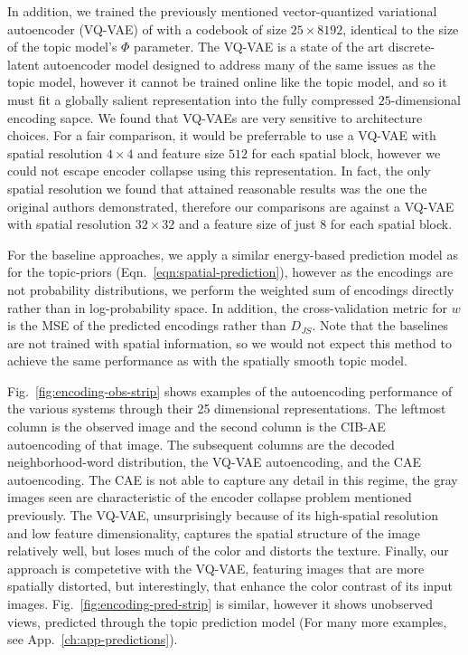 In addition, we trained the previously mentioned vector-quantized variational autoencoder (VQ-VAE) of \citep{vqvae2017} with a codebook of size $25 \times 8192$, identical to the size of the topic model's $\Phi$ parameter. The VQ-VAE is a state of the art discrete-latent autoencoder model designed to address many of the same issues as the topic model, however it cannot be trained online like the topic model, and so it must fit a globally salient representation into the fully compressed $25$-dimensional encoding sapce. We found that VQ-VAEs are very sensitive to architecture choices. For a fair comparison, it would be preferrable to use a VQ-VAE with spatial resolution $4 \times 4$ and feature size $512$ for each spatial block, however we could not escape encoder collapse using this representation. In fact, the only spatial resolution we found that attained reasonable results was the one the original authors demonstrated, therefore our comparisons are against a VQ-VAE with spatial resolution $32 \times 32$ and a feature size of just $8$ for each spatial block.

For the baseline approaches, we apply a similar energy-based prediction model as for the topic-priors (Eqn.~\ref{eqn:spatial-prediction}), however as the encodings are not probability distributions, we perform the weighted sum of encodings directly rather than in log-probability space. In addition, the cross-validation metric for $w$ is the MSE of the predicted encodings rather than $D_{JS}$. Note that the baselines are not trained with spatial information, so we would not expect this method to achieve the same performance as with the spatially smooth topic model.

Fig.~\ref{fig:encoding-obs-strip} shows examples of the autoencoding performance of the various systems through their 25 dimensional representations. The leftmost column is the observed image and the second column is the CIB-AE autoencoding of that image. The subsequent columns are the decoded neighborhood-word distribution, the VQ-VAE autoencoding, and the CAE autoencoding. The CAE is not able to capture any detail in this regime, the gray images seen are characteristic of the encoder collapse problem mentioned previously. The VQ-VAE, unsurprisingly because of its high-spatial resolution and low feature dimensionality, captures the spatial structure of the image relatively well, but loses much of the color and distorts the texture. Finally, our approach is competetive with the VQ-VAE, featuring images that are more spatially distorted, but interestingly, that enhance the color contrast of its input images. Fig.~\ref{fig:encoding-pred-strip} is similar, however it shows unobserved views, predicted through the topic prediction model (For many more examples, see App.~\ref{ch:app-predictions}).

